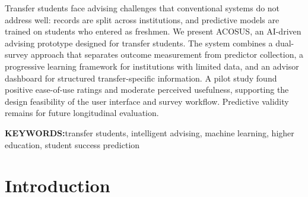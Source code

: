 \documentclass[letterpaper,11pt]{article}
\begin{document}

Transfer students face advising challenges that conventional systems do not address well: records are split across institutions, and predictive models are trained on students who entered as freshmen. We present ACOSUS, an AI-driven advising prototype designed for transfer students. The system combines a dual-survey approach that separates outcome measurement from predictor collection, a progressive learning framework for institutions with limited data, and an advisor dashboard for structured transfer-specific information. A pilot study found positive ease-of-use ratings and moderate perceived usefulness, supporting the design feasibility of the user interface and survey workflow. Predictive validity remains for future longitudinal evaluation.

\bigskip

\noindent\textbf{KEYWORDS:}\quad transfer students, intelligent advising, machine learning, higher education, student success prediction

\section{Introduction}\label{sec:introduction}
\end{document}
